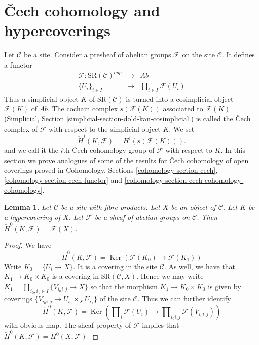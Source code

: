 \documentclass{stacks-project}
\theoremstyle{plain}
\newtheorem{lemma}[subsection]{Lemma}
\theoremstyle{definition}
\theoremstyle{remark}
\numberwithin{equation}{subsection}
\def\Ker{\mathop{\mathrm{Ker}}}
\begin{document}
\section{{\v C}ech cohomology and hypercoverings}
\label{section-hyper-cech}

\noindent
Let $\mathcal{C}$ be a site. Consider a presheaf of
abelian groups $\mathcal{F}$ on the site $\mathcal{C}$.
It defines a functor
\begin{eqnarray*}
\mathcal{F} : \text{SR}(\mathcal{C})^{opp}
& \longrightarrow &
\textit{Ab} \\
\{U_i\}_{i \in I} &
\longmapsto &
\prod\nolimits_{i \in I} \mathcal{F}(U_i)
\end{eqnarray*}
Thus a simplicial object $K$ of $\text{SR}(\mathcal{C})$
is turned into a cosimplicial object $\mathcal{F}(K)$ of $\textit{Ab}$.
The cochain complex $s(\mathcal{F}(K))$ associated to $\mathcal{F}(K)$
(Simplicial, Section
\ref{simplicial-section-dold-kan-cosimplicial})
is called the {\v C}ech complex of $\mathcal{F}$ with
respect to the simplicial object $K$. We set
$$
\check{H}^i(K, \mathcal{F})
=
H^i(s(\mathcal{F}(K))).
$$
and we call it the $i$th {\v C}ech cohomology group
of $\mathcal{F}$ with respect to $K$.
In this section we prove analogues of some of the results for
{\v C}ech cohomology of open coverings proved in
Cohomology, Sections \ref{cohomology-section-cech},
\ref{cohomology-section-cech-functor} and
\ref{cohomology-section-cech-cohomology-cohomology}.

\begin{lemma}
\label{lemma-h0-cech}
Let $\mathcal{C}$ be a site with fibre products.
Let $X$ be an object of $\mathcal{C}$.
Let $K$ be a hypercovering of $X$.
Let $\mathcal{F}$ be a sheaf of abelian groups on $\mathcal{C}$.
Then $\check{H}^0(K, \mathcal{F}) = \mathcal{F}(X)$.
\end{lemma}

\begin{proof}
We have
$$
\check{H}^0(K, \mathcal{F})
=
\Ker(\mathcal{F}(K_0) \longrightarrow \mathcal{F}(K_1))
$$
Write $K_0 = \{U_i \to X\}$. It is a covering in the site
$\mathcal{C}$. As well, we have that $K_1 \to K_0 \times K_0$
is a covering in $\text{SR}(\mathcal{C}, X)$. Hence we may
write $K_1 = \amalg_{i_0, i_1 \in I} \{V_{i_0i_1j} \to X\}$
so that the morphism $K_1 \to K_0 \times K_0$ is given
by coverings $\{V_{i_0i_1j} \to U_{i_0} \times_X U_{i_1}\}$
of the site $\mathcal{C}$. Thus we can further identify
$$
\check{H}^0(K, \mathcal{F})
=
\Ker(
\prod\nolimits_i \mathcal{F}(U_i)
\longrightarrow
\prod\nolimits_{i_0i_1 j} \mathcal{F}(V_{i_0i_1j})
)
$$
with obvious map. The sheaf property of $\mathcal{F}$
implies that $\check{H}^0(K, \mathcal{F}) = H^0(X, \mathcal{F})$.
\end{proof}
\end{document}
